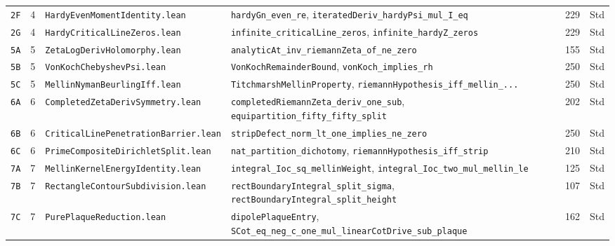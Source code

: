 \documentclass[11pt,a4paper]{article}
\theoremstyle{definition}
\begin{document}
\begin{longtable}{@{}ll>{\raggedright\arraybackslash}p{5.2cm}>{\raggedright\arraybackslash}p{6.8cm}cc@{}}
\texttt{2F} & 4 & \texttt{HardyEvenMomentIdentity.lean} & \texttt{hardyGn\_\allowbreak even\_\allowbreak re}, \texttt{iteratedDeriv\_\allowbreak hardyPsi\_\allowbreak mul\_\allowbreak I\_\allowbreak eq} & 229 & Std \\
\texttt{2G} & 4 & \texttt{HardyCriticalLineZeros.lean} & \texttt{infinite\_\allowbreak criticalLine\_\allowbreak zeros}, \texttt{infinite\_\allowbreak hardyZ\_\allowbreak zeros} & 229 & Std \\
\texttt{5A} & 5 & \texttt{ZetaLogDerivHolomorphy.lean} & \texttt{analyticAt\_\allowbreak inv\_\allowbreak riemannZeta\_\allowbreak of\_\allowbreak ne\_\allowbreak zero} & 155 & Std \\
\texttt{5B} & 5 & \texttt{VonKochChebyshevPsi.lean} & \texttt{VonKochRemainderBound}, \texttt{vonKoch\_\allowbreak implies\_\allowbreak rh} & 250 & Std \\
\texttt{5C} & 5 & \texttt{MellinNymanBeurlingIff.lean} & \texttt{TitchmarshMellinProperty}, \texttt{riemannHypothesis\_\allowbreak iff\_\allowbreak mellin\_\allowbreak ...} & 250 & Std \\
\texttt{6A} & 6 & \texttt{CompletedZetaDerivSymmetry.lean} & \texttt{completedRiemannZeta\_\allowbreak deriv\_\allowbreak one\_\allowbreak sub}, \texttt{equipartition\_\allowbreak fifty\_\allowbreak fifty\_\allowbreak split} & 202 & Std \\
\texttt{6B} & 6 & \texttt{Critical\allowbreak Line\allowbreak Penetration\allowbreak Barrier.lean} & \texttt{stripDefect\_\allowbreak norm\_\allowbreak lt\_\allowbreak one\_\allowbreak implies\_\allowbreak ne\_\allowbreak zero} & 250 & Std \\
\texttt{6C} & 6 & \texttt{PrimeCompositeDirichletSplit.lean} & \texttt{nat\_\allowbreak partition\_\allowbreak dichotomy}, \texttt{riemannHypothesis\_\allowbreak iff\_\allowbreak strip} & 210 & Std \\
\texttt{7A} & 7 & \texttt{MellinKernelEnergyIdentity.lean} & \texttt{integral\_\allowbreak Ioc\_\allowbreak sq\_\allowbreak mellinWeight}, \texttt{integral\_\allowbreak Ioc\_\allowbreak two\_\allowbreak mul\_\allowbreak mellin\_\allowbreak le} & 125 & Std \\
\texttt{7B} & 7 & \texttt{RectangleContourSubdivision.lean} & \texttt{rectBoundaryIntegral\_\allowbreak split\_\allowbreak sigma}, \texttt{rectBoundaryIntegral\_\allowbreak split\_\allowbreak height} & 107 & Std \\
\texttt{7C} & 7 & \texttt{PurePlaqueReduction.lean} & \texttt{dipolePlaqueEntry}, \texttt{SCot\_\allowbreak eq\_\allowbreak neg\_\allowbreak c\_\allowbreak one\_\allowbreak mul\_\allowbreak linearCotDrive\_\allowbreak sub\_\allowbreak plaque} & 162 & Std \\

\end{longtable}
\end{document}
